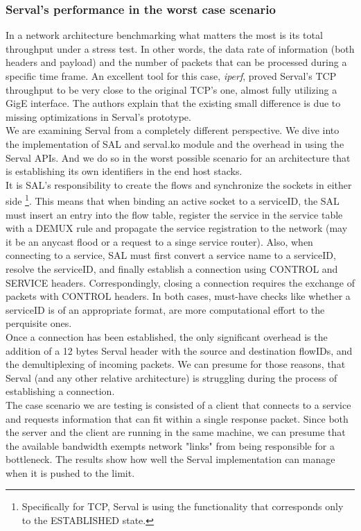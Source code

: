 \subsubsection{Serval's performance in the worst case scenario}
In a network architecture benchmarking what matters the most is its total throughput under a stress test.
In other words, the data rate of information (both headers and payload) and the number of packets that can be processed during a specific time frame.
An excellent tool for this case, \emph{iperf}, proved Serval's TCP throughput to be very close to the original TCP's one, almost fully utilizing a GigE interface. 
The authors explain that the existing small difference is due to missing optimizations in Serval's prototype.
\\ \indent We are examining Serval from a completely different perspective.
We dive into the implementation of SAL and serval.ko module and the overhead in using the Serval APIs.
And we do so in the worst possible scenario for an architecture that is establishing its own identifiers in the end host stacks.
\\ \indent It is SAL's responsibility to create the flows and synchronize the sockets in either side \footnote{Specifically for TCP, Serval is using the functionality that corresponds only to the ESTABLISHED state.}.
This means that when binding an active socket to a serviceID, the SAL must insert an entry into the flow table, register the service in the service table with a DEMUX rule and propagate the service registration to the network (may it be an anycast flood or a request to a singe service router).
Also, when connecting to a service, SAL must first convert a service name to a serviceID, resolve the serviceID, and finally establish a connection using CONTROL and SERVICE headers.
Correspondingly, closing a connection requires the exchange of packets with CONTROL headers.
In both cases, must-have checks like whether a serviceID is of an appropriate format, are more computational effort to the perquisite ones.
\\ \indent Once a connection has been established, the only significant overhead is the addition of a 12 bytes Serval header with the source and destination flowIDs, and the demultiplexing of incoming packets.
We can presume for those reasons, that Serval (and any other relative architecture) is struggling during the process of establishing a connection.
\\ \indent The case scenario we are testing is consisted of a client that connects to a service and requests information that can fit within a single response packet.
Since both the server and the client are running in the same machine, we can presume that the available bandwidth exempts network "links" from being responsible for a bottleneck.
The results show how well the Serval implementation can manage when it is pushed to the limit.

